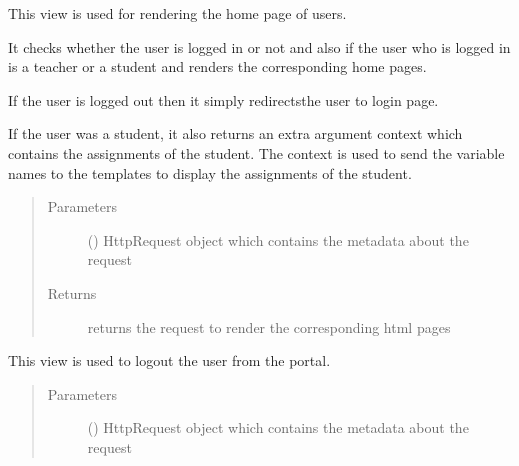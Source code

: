 \documentclass[letterpaper,10pt,english]{sphinxmanual}
\begin{document}
\begin{fulllineitems}
\label{\detokenize{users:users.views.home}}
\sphinxAtStartPar
This view is used for rendering the home page of users.

\sphinxAtStartPar
It checks whether the user is logged in or not and also if the user who is logged in is a teacher or a student and renders the
corresponding home pages.

\sphinxAtStartPar
If the user is logged out then it simply redirectsthe user to login page.

\sphinxAtStartPar
If the user was a student, it also returns an extra argument context which contains the assignments of the student. The context is used to send the variable names to the templates to display the assignments of the student.
\begin{quote}\begin{description}
\item[{Parameters}] \leavevmode
\sphinxAtStartPar
{} () \textendash{} HttpRequest object which contains the metadata about the request

\item[{Returns}] \leavevmode
\sphinxAtStartPar
returns the request to render the corresponding html pages

\end{description}\end{quote}

\end{fulllineitems}


\begin{fulllineitems}
\label{\detokenize{users:users.views.logout_view}}
\sphinxAtStartPar
This view is used to logout the user from the portal.
\begin{quote}\begin{description}
\item[{Parameters}] \leavevmode
\sphinxAtStartPar
{} () \textendash{} HttpRequest object which contains the metadata about the request

\end{description}\end{quote}

\end{fulllineitems}
\end{document}

